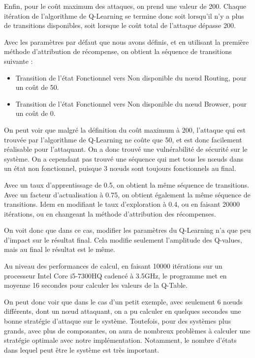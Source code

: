 \documentclass[a4paper]{article}
\begin{document}
    Enfin, pour le coût maximum des attaques, on prend une valeur de 200.
    Chaque itération de l'algorithme de Q-Learning se termine donc soit lorsqu'il n'y a plus de transitions disponibles, soit lorsque le coût total de l'attaque dépasse 200.

    Avec les paramètres par défaut que nous avons définis, et en utilisant la première méthode d'attribution de récompense, on obtient la séquence de transitions suivante :
    \begin{itemize}
        \item Transition de l'état Fonctionnel vers Non disponible du n\oe ud Routing, pour un coût de 50.
        \item Transition de l'état Fonctionnel vers Non disponible du n\oe ud Browser, pour un coût de 0.
    \end{itemize}

    On peut voir que malgré la définition du coût maximum à 200, l'attaque qui est trouvée par l'algorithme de Q-Learning ne coûte que 50, et est donc facilement réalisable pour l'attaquant.
    On a donc trouvé une vulnérabilité de sécurité sur le système.
    On a cependant pas trouvé une séquence qui met tous les n\oe uds dans un état non fonctionnel, puisque 3 n\oe uds sont toujours fonctionnels au final.

    Avec un taux d'apprentissage de 0.5, on obtient la même séquence de transitions.
    Avec un facteur d'actualisation à 0.75, on obtient également la même séquence de transitions.
    Idem en modifiant le taux d'exploration à 0.4, ou en faisant 20000 itérations, ou en changeant la méthode d'attribution des récompenses.

    On voit donc que dans ce cas, modifier les paramètres du Q-Learning n'a que peu d'impact sur le résultat final.
    Cela modifie seulement l'amplitude des Q-values, mais au final le résultat est le même.

    Au niveau des performances de calcul, en faisant 10000 itérations sur un processeur Intel Core i5-7300HQ cadencé à 3.5GHz, le programme met en moyenne 16 secondes pour calculer les valeurs de la Q-Table.

    On peut donc voir que dans le cas d'un petit exemple, avec seulement 6 n\oe uds différents, dont un n\oe ud attaquant, on a pu calculer en quelques secondes une bonne stratégie d'attaque sur le système.
    Toutefois, pour des systèmes plus grands, avec plus de composantes, on aura de nombreux problèmes à calculer une stratégie optimale avec notre implémentation.
    Notamment, le nombre d'états dans lequel peut être le système est très important.
\end{document}
